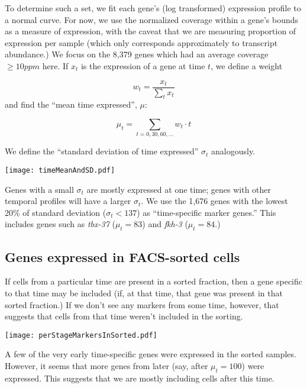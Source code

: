 \documentclass{article}
\begin{document}
To determine such a set, we fit each gene's (log transformed) expression
profile to a normal curve.
For now, we use the normalized coverage within a gene's bounds as a measure
of expression, with the caveat that we are measuring proportion of expression per
sample (which only corresponds approximately to transcript abundance.)
We focus on the 8,379 genes which had an average coverage $\ge 10 ppm$ here.
 If $x_t$ is the expression of a gene at time $t$,
we define a weight

\[
w_t = \frac{x_t}{\sum_t x_t}
\]
and find the ``mean time expressed'', $\mu$:

\[
\mu_t = \sum_{t = 0,30,60,...} w_t \cdot t
\]

We define the ``standard deviation of time expressed'' $\sigma_t$ analogously.


\begin{center}
\texttt{[image: timeMeanAndSD.pdf]}
\end{center}

Genes with a small $\sigma_t$ are mostly expressed at one time; genes with
other temporal profiles will have a larger $\sigma_t$. We use the 1,676
genes with the lowest 20\% of standard deviation ($\sigma_t < 137$)
as ``time-specific marker genes.''
This includes genes such as {\em tbx-37} ($\mu_t = 83$) and {\em fkh-3}
($\mu_t = 84$.)

\subsection*{Genes expressed in FACS-sorted cells}

If cells from a particular time are present in a sorted fraction, then a
gene specific to that time may be included (if, at that time, that gene was present in
that sorted fraction.)
If we don't see any markers from some time, however,
that suggests that cells from that time weren't included in the sorting.

\texttt{[image: perStageMarkersInSorted.pdf]}

A few of the very early time-specific genes were expressed in the sorted samples.
However, it seems that more genes from later (say, after $\mu_t = 100$)
were expressed. This suggests that we are mostly including cells after this time.
\end{document}
